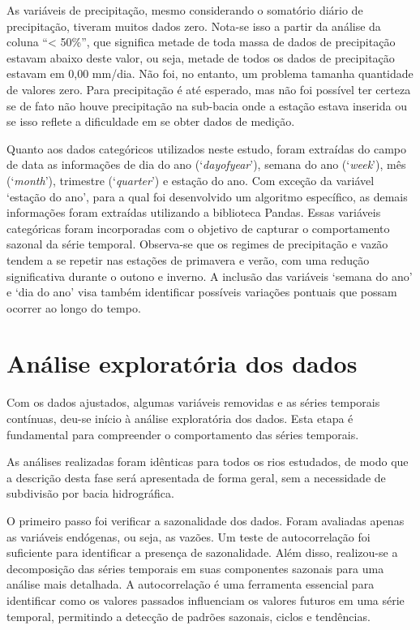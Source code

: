 As variáveis de precipitação, mesmo considerando o somatório diário de precipitação, tiveram muitos dados zero. Nota-se isso a partir da análise da coluna ``< 50\%'', que significa metade de toda massa de dados de precipitação estavam abaixo deste valor, ou seja, metade de todos os dados de precipitação estavam em 0,00 mm/dia. Não foi, no entanto, um problema tamanha quantidade de valores zero. Para precipitação é até esperado, mas não foi possível ter certeza se de fato não houve precipitação na sub-bacia onde a estação estava inserida ou se isso reflete a dificuldade em se obter dados de medição.

Quanto aos dados categóricos utilizados neste estudo, foram extraídas do campo de data as informações de dia do ano (`\textit{dayofyear}'), semana do ano (`\textit{week}'), mês (`\textit{month}'), trimestre (`\textit{quarter}') e estação do ano. Com exceção da variável `estação do ano', para a qual foi desenvolvido um algoritmo específico, as demais informações foram extraídas utilizando a biblioteca Pandas.\cite{mckinney2011pandas} Essas variáveis categóricas foram incorporadas com o objetivo de capturar o comportamento sazonal da série temporal. Observa-se que os regimes de precipitação e vazão tendem a se repetir nas estações de primavera e verão, com uma redução significativa durante o outono e inverno. A inclusão das variáveis `semana do ano' e `dia do ano' visa também identificar possíveis variações pontuais que possam ocorrer ao longo do tempo.

\section{Análise exploratória dos dados}

Com os dados ajustados, algumas variáveis removidas e as séries temporais contínuas, deu-se início à análise exploratória dos dados. Esta etapa é fundamental para compreender o comportamento das séries temporais.

As análises realizadas foram idênticas para todos os rios estudados, de modo que a descrição desta fase será apresentada de forma geral, sem a necessidade de subdivisão por bacia hidrográfica.

O primeiro passo foi verificar a sazonalidade dos dados. Foram avaliadas apenas as variáveis endógenas, ou seja, as vazões. Um teste de autocorrelação foi suficiente para identificar a presença de sazonalidade. Além disso, realizou-se a decomposição das séries temporais em suas componentes sazonais para uma análise mais detalhada. A autocorrelação é uma ferramenta essencial para identificar como os valores passados influenciam os valores futuros em uma série temporal, permitindo a detecção de padrões sazonais, ciclos e tendências.

